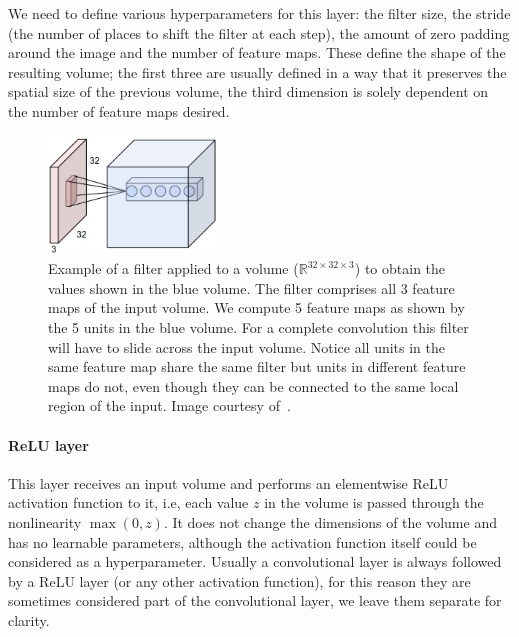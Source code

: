 We need to define various hyperparameters for this layer: the filter size, the stride (the number of places to shift the filter at each step), the amount of zero padding around the image and the number of feature maps. These define the shape of the resulting volume; the first three are usually defined in a way that it preserves the spatial size of the previous volume, the third dimension is solely dependent on the number of feature maps desired.
\begin{figure}[h]
	\centering
	\includegraphics[width = 0.4\textwidth]{plots/convLayer.jpeg}
	\caption[Example of a filter in a convolutional layer]{Example of a filter applied to a volume ($\mathbb{R}^{32\times 32\times 3}$) to obtain the values shown in the blue volume. The filter comprises all 3 feature maps of the input volume. We compute 5 feature maps as shown by the 5 units in the blue volume. For a complete convolution this filter will have to slide across the input volume. Notice all units in the same feature map share the same filter but units in different feature maps do not, even though they can be connected to the same local region of the input. Image courtesy of~\cite{Karpathy2015}.}
	\label{fig:ConvLayer}
\end{figure}

\paragraph{ReLU layer} This layer receives an input volume and performs an elementwise ReLU activation function to it, i.e, each value $z$ in the volume is passed through the nonlinearity $\max(0,z)$. It does not change the dimensions of the volume and has no learnable parameters, although the activation function itself could be considered as a hyperparameter. Usually a convolutional layer is always followed by a ReLU layer (or any other activation function), for this reason they are sometimes considered part of the convolutional layer, we leave them separate for clarity.

